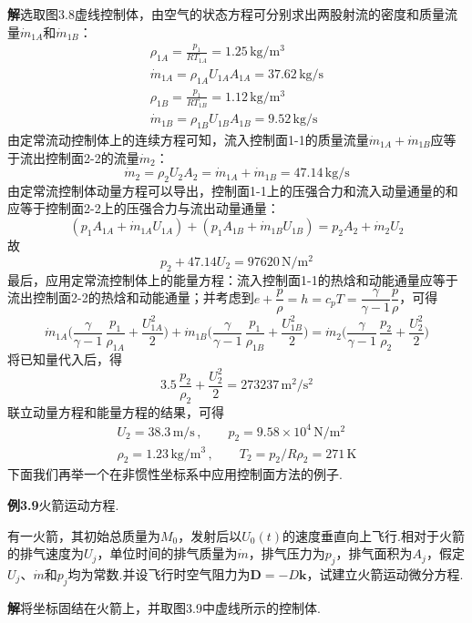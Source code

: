 \noindent\textbf{解}\quad 选取图3.8虚线控制体，由空气的状态方程可分别求出两股射流的密度和质量流量$\dot{m}_{1A}$和$\dot{m}_{1B}$：
\begin{gather*}
\rho_{1A}=\frac{p_1}{RT_{1A}}=1.25\,\mathrm{kg/m^3}\\[2pt]
\dot{m}_{1A}=\rho_{1A}U_{1A}A_{1A}=37.62\,\mathrm{kg/s}\\[2pt]
\rho_{1B}=\frac{p_1}{RT_{1B}}=1.12\,\mathrm{kg/m^3}\\[2pt]
\dot{m}_{1B}=\rho_{1B}U_{1B}A_{1B}=9.52\,\mathrm{kg/s}
\end{gather*}
由定常流动控制体上的连续方程可知，流入控制面1-1的质量流量$\dot{m}_{1A}+\dot{m}_{1B}$应等于流出控制面2-2的流量$\dot{m}_2$：
\[
\dot{m}_2=\rho_2U_2A_2=\dot{m}_{1A}+\dot{m}_{1B}=47.14\,\mathrm{kg/s}
\]
由定常流控制体动量方程可以导出，控制面1-1上的压强合力和流入动量通量的和应等于控制面2-2上的压强合力与流出动量通量：
\[
(p_1A_{1A}+\dot{m}_{1A}U_{1A})+(p_1A_{1B}+\dot{m}_{1B}U_{1B})=p_2A_2+\dot{m}_2U_2
\]
故
\[
p_2+47.14U_2=97620\,\mathrm{N/m^2}
\]
最后，应用定常流控制体上的能量方程：流入控制面1-1的热焓和动能通量应等于流出控制面2-2的热焓和动能通量；并考虑到$e+\dfrac{p}{\rho}=h=c_pT=\dfrac{\gamma}{\gamma-1}\dfrac{p}{\rho}$，可得
\[
\dot{m}_{1A}\Big(\frac{\gamma}{\gamma-1}\,\frac{p_1}{\rho_{1A}}+\frac{U_{1A}^{2}}{2}\Big)+\dot{m}_{1B}\Big(\frac{\gamma}{\gamma-1}\,\frac{p_1}{\rho_{1B}}+\frac{U_{1B}^{2}}{2}\Big)=\dot{m}_2\Big(\frac{\gamma}{\gamma-1}\,\frac{p_2}{\rho_2}+\frac{U_2^{2}}{2}\Big)
\]
将已知量代入后，得
\[
3.5\,\frac{p_2}{\rho_2}+\frac{U_2^{2}}{2}=273237\,\mathrm{m^2/s^2}
\]
联立动量方程和能量方程的结果，可得
\begin{gather*}
U_2=38.3\,\mathrm{m/s}\,,\qquad p_2=9.58\times 10^{4}\,\mathrm{N/m^2}\\[2pt]
\rho_2=1.23\,\mathrm{kg/m^3}\,,\qquad T_2=p_2/R\rho_2=271\,\mathrm{K}
\end{gather*}
下面我们再举一个在非惯性坐标系中应用控制面方法的例子.

\noindent\textbf{例3.9}\quad 火箭运动方程.

有一火箭，其初始总质量为$M_0$，发射后以$U_0(t)$的速度垂直向上飞行.相对于火箭的排气速度为$U_j$，单位时间的排气质量为$\dot{m}$，排气压力为$p_j$，排气面积为$A_j$，假定$U_j$、$\dot{m}$和$p_j$均为常数.并设飞行时空气阻力为$\boldsymbol{D}=-D\boldsymbol{k}$，试建立火箭运动微分方程.

\noindent\textbf{解}\quad 将坐标固结在火箭上，并取图3.9中虚线所示的控制体.

